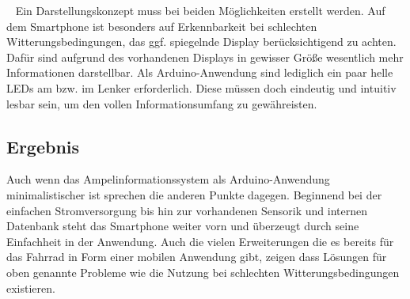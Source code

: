 \begin{description}[leftmargin=0.7cm,style=nextline]
  \item[Darstellung] ~ Ein Darstellungskonzept muss bei beiden Möglichkeiten erstellt werden. Auf dem \gls{Smartphone} ist besonders auf Erkennbarkeit bei schlechten Witterungsbedingungen, das ggf. spiegelnde Display berücksichtigend zu achten. Dafür sind aufgrund des vorhandenen Displays in gewisser Größe wesentlich mehr Informationen darstellbar. Als \gls{Arduino}-Anwendung sind lediglich ein paar helle \glspl{LED} am bzw. im Lenker erforderlich. Diese müssen doch eindeutig und intuitiv lesbar sein, um den vollen Informationsumfang zu gewähreisten.\\
\end{description}
\subsection*{Ergebnis}  
Auch wenn das Ampelinformationssystem als \gls{Arduino}-Anwendung minimalistischer ist sprechen die anderen Punkte dagegen. Beginnend bei der einfachen Stromversorgung bis hin zur vorhandenen Sensorik und internen Datenbank steht das \gls{Smartphone} weiter vorn und überzeugt durch seine Einfachheit in der Anwendung. Auch die vielen Erweiterungen die es bereits für das Fahrrad in Form einer mobilen Anwendung gibt, zeigen dass Lösungen für oben genannte Probleme wie die Nutzung bei schlechten Witterungsbedingungen existieren.

